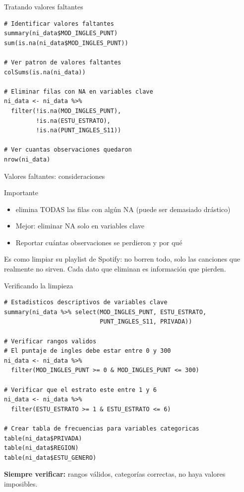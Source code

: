 \documentclass[aspectratio=169, 11pt]{beamer}
\begin{document}
\begin{frame}[fragile]{Tratando valores faltantes}
\begin{lstlisting}
# Identificar valores faltantes
summary(ni_data$MOD_INGLES_PUNT)
sum(is.na(ni_data$MOD_INGLES_PUNT))

# Ver patron de valores faltantes
colSums(is.na(ni_data))

# Eliminar filas con NA en variables clave
ni_data <- ni_data %>%
  filter(!is.na(MOD_INGLES_PUNT),
         !is.na(ESTU_ESTRATO),
         !is.na(PUNT_INGLES_S11))

# Ver cuantas observaciones quedaron
nrow(ni_data)
\end{lstlisting}
\end{frame}

\begin{frame}{Valores faltantes: consideraciones}
\begin{alertblock}{Importante}
\begin{itemize}
\item {} elimina TODAS las filas con alg\'un NA (puede ser demasiado dr\'astico)
\item Mejor: eliminar NA solo en variables clave
\item Reportar cu\'antas observaciones se perdieron y por qu\'e
\end{itemize}

\small
Es como limpiar su playlist de Spotify: no borren todo, solo las canciones que realmente no sirven. Cada dato que eliminan es informaci\'on que pierden.
\end{alertblock}
\end{frame}

\begin{frame}[fragile]{Verificando la limpieza}
\begin{lstlisting}
# Estadisticos descriptivos de variables clave
summary(ni_data %>% select(MOD_INGLES_PUNT, ESTU_ESTRATO,
                           PUNT_INGLES_S11, PRIVADA))

# Verificar rangos validos
# El puntaje de ingles debe estar entre 0 y 300
ni_data <- ni_data %>%
  filter(MOD_INGLES_PUNT >= 0 & MOD_INGLES_PUNT <= 300)

# Verificar que el estrato este entre 1 y 6
ni_data <- ni_data %>%
  filter(ESTU_ESTRATO >= 1 & ESTU_ESTRATO <= 6)

# Crear tabla de frecuencias para variables categoricas
table(ni_data$PRIVADA)
table(ni_data$REGION)
table(ni_data$ESTU_GENERO)
\end{lstlisting}

\footnotesize
\textbf{Siempre verificar:} rangos v\'alidos, categor\'ias correctas, no haya valores imposibles.
\end{frame}
\end{document}
